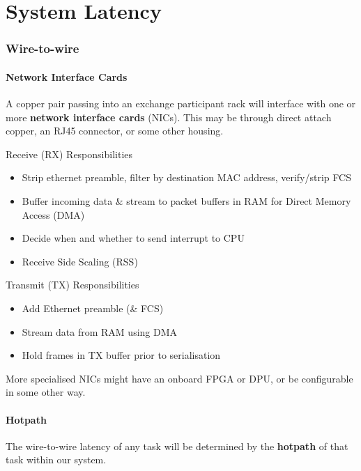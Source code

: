 \documentclass{article}
\newif\ifhasdiagram
\newcommand{\sectiondiagram}[1]{%
    \def\insertsdiagram{#1}%
    \hasdiagramtrue
}
\newcommand{\sectionquote}[1]{%
    \def\insertsquote{\small #1}%
}
\newcommand{\insertsdiagram}{}
\newcommand{\insertsquote}{}
\renewcommand{\insertsquote}{}%
\begin{document}
\part{System Latency}

\sectiondiagram{network}
\sectionquote{``In the fields of observation chance favours only the prepared mind.'' Louis Pasteur}
\section{Wire-to-wire}
\subsection{Network Interface Cards}
A copper pair passing into an exchange participant rack will interface with one or more \textbf{network interface cards} (NICs). This may be through direct attach copper, an RJ45 connector, or some other housing.

\begin{block}{Receive (RX) Responsibilities}
	\begin{itemize}
	\item Strip ethernet preamble, filter by destination MAC address, verify/strip FCS
	\item Buffer incoming data \& stream to packet buffers in RAM for Direct Memory Access (DMA)
	\item Decide when and whether to send interrupt to CPU
	\item Receive Side Scaling (RSS)
	\end{itemize}
\end{block}

\begin{block}{Transmit (TX) Responsibilities}
	\begin{itemize}
	\item Add Ethernet preamble (\& FCS)
	\item Stream data from RAM using DMA
	\item Hold frames in TX buffer prior to serialisation
	\end{itemize}
\end{block}

More specialised NICs might have an onboard FPGA or DPU, or be configurable in some other way.

\subsection{Hotpath}
The wire-to-wire latency of any task will be determined by the \textbf{hotpath} of that task within our system.
\end{document}
